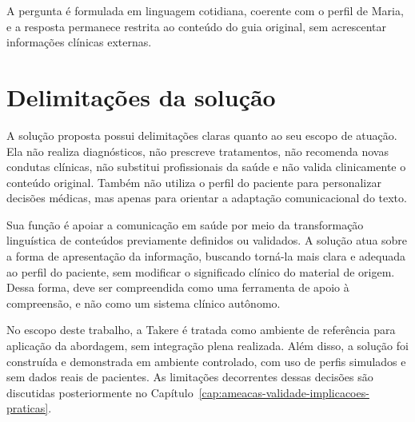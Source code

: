 A pergunta é formulada em linguagem cotidiana, coerente com o perfil de Maria, e a resposta permanece restrita ao conteúdo do guia original, sem acrescentar informações clínicas externas.

\section{Delimitações da solução}
\label{sec:delimitacoes-solucao}

A solução proposta possui delimitações claras quanto ao seu escopo de atuação. Ela não realiza diagnósticos, não prescreve tratamentos, não recomenda novas condutas clínicas, não substitui profissionais da saúde e não valida clinicamente o conteúdo original. Também não utiliza o perfil do paciente para personalizar decisões médicas, mas apenas para orientar a adaptação comunicacional do texto.

Sua função é apoiar a comunicação em saúde por meio da transformação linguística de conteúdos previamente definidos ou validados. A solução atua sobre a forma de apresentação da informação, buscando torná-la mais clara e adequada ao perfil do paciente, sem modificar o significado clínico do material de origem. Dessa forma, deve ser compreendida como uma ferramenta de apoio à compreensão, e não como um sistema clínico autônomo.

No escopo deste trabalho, a Takere é tratada como ambiente de referência para aplicação da abordagem, sem integração plena realizada. Além disso, a solução foi construída e demonstrada em ambiente controlado, com uso de perfis simulados e sem dados reais de pacientes. As limitações decorrentes dessas decisões são discutidas posteriormente no Capítulo~\ref{cap:ameacas-validade-implicacoes-praticas}.